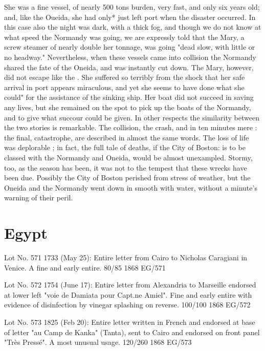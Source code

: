 \documentclass[justified]{tufte-book}
\begin{document}
She was a fine vessel, of nearly 500 tons burden, very fast, and only six years old; and, like the Oueida, she had only* just left port when the disaster occurred. In this case also the night was dark, with a thick fog, and though we do not know at what speed the Normandy was going, we are expressly told that the Mary, a screw steamer of nearly double her tonnage, was going "dead slow, with little or no headway." Nevertheless, when these vessels came into collision the Normandy shared the fate of the Oneida, and was instantly cut down. The Mary, however, did not escape like the . She suffered so terribly from the shock that her safe arrival in port appears miraculous, and yet she seems to have done what she could" for the assistance of the sinking ship. Her boat did not succeed in saving any lives, but she remained on the spot to pick up the boats of the Normandy, and to give what succour could be given. In other respects the similarity between the two stories is remarkable. The collision, the crash, and in ten minutes mere : the final, catastrophe, are described in almost the same words. The loss of life was deplorable ; in fact, the full tale of deaths, if the City of Boston: is to be classed with the Normandy and Oneida, would be almost unexampled. Stormy, too, as the season has been, it was not to the tempest that these wrecks have been due. Possibly the City of Boston perished from stress of weather, but the Oneida and the Normandy went down in smooth with water, without a minute's warning of their peril.



\chapter{Egypt}


%
{Lot No. 571
1733 (May 25): Entire letter from Cairo to Nicholas Caragiani in Venice. A fine and early entire. 80/85}%
{1868}%
{EG/571}%
{}%
{}
{}%
{}

%
{Lot No. 572
1754 (June 17): Entire letter from Alexandria to Marseille endorsed at lower left "voie de Damiata pour Capt.ne Amiel". Fine and early entire with evidence of disinfection by vinegar splashing on reverse. 100/100}%
{1868}%
{EG/572}%
{}%
{}
{}%
{}

%
{Lot No. 573
1825 (Feb 20): Entire letter written in French and endorsed at base of letter "au Camp de Kanka" (Tanta), sent to Cairo and endorsed on front panel "Très Pressé". A most unusual usage. 120/260
}%
{1868}%
{EG/573}%
{}%
{}
{}%
{}
\end{document}
